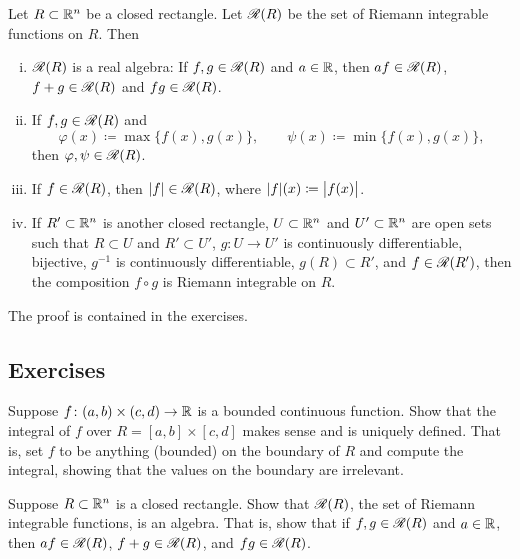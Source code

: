 \begin{cor} \label{cor:closednessofriemannintegrable}
\pagebreak[2]
Let $R \subset {\mathbb{R}}^n$ be a closed rectangle.  Let ${\mathscr{R}}(R)$ be the set
of Riemann integrable functions on $R$.  Then
\begin{enumerate}[(i)]
\item
${\mathscr{R}}(R)$ is a real algebra:
If $f,g \in {\mathscr{R}}(R)$ and $a \in {\mathbb{R}}$, then $af \in {\mathscr{R}}(R)$, $f+g \in {\mathscr{R}}(R)$
and $fg \in {\mathscr{R}}(R)$.
\item
If $f,g \in {\mathscr{R}}(R)$ and
\begin{equation*}
\varphi(x) \coloneqq \max \bigl\{ f(x) , g(x) \bigr\} ,
\qquad
\psi(x) \coloneqq \min \bigl\{ f(x) , g(x) \bigr\} ,
\end{equation*}
then $\varphi, \psi \in {\mathscr{R}}(R)$.
\item
If $f \in {\mathscr{R}}(R)$, then $\lvert {f} \rvert \in {\mathscr{R}}(R)$, where $\lvert {f} \rvert(x) \coloneqq
\bigl\lvert {f(x)} \bigr\rvert$.
\item
If $R' \subset {\mathbb{R}}^n$ is another closed rectangle,
$U \subset {\mathbb{R}}^n$ and $U' \subset {\mathbb{R}}^n$ are open sets such that
$R \subset U$ and $R' \subset U'$,
$g \colon U \to U'$ is continuously differentiable, bijective,
$g^{-1}$ is continuously differentiable,
$g(R) \subset R'$,
and $f \in {\mathscr{R}}(R')$,
then the composition $f \circ g$ is Riemann integrable on $R$.
\end{enumerate}
\end{cor}

The proof is contained in the exercises.

\subsection{Exercises}

\begin{exercise}
Suppose $f \colon (a,b) \times (c,d) \to {\mathbb{R}}$ is a bounded continuous
function.  Show that the integral of $f$ over $R = [a,b] \times [c,d]$ makes sense
and is uniquely defined.  That is, set $f$ to be anything (bounded) on the boundary of
$R$ and compute the integral, showing that the values on the boundary are
irrelevant.
\end{exercise}

\begin{exercise}
Suppose $R \subset {\mathbb{R}}^n$ is a closed rectangle.  Show that ${\mathscr{R}}(R)$, the set
of Riemann integrable functions, is an algebra.  That is, show that
if $f,g \in {\mathscr{R}}(R)$ and $a \in {\mathbb{R}}$, then $af \in {\mathscr{R}}(R)$, $f+g \in {\mathscr{R}}(R)$,
and $fg \in {\mathscr{R}}(R)$.
\end{exercise}

